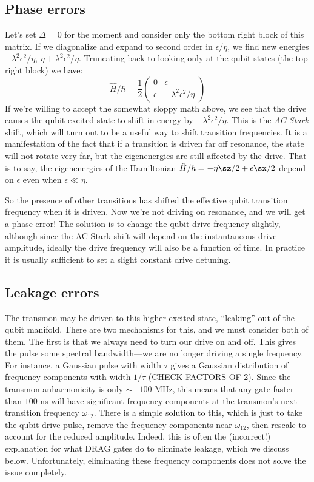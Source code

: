 \subsection{Phase errors}
\label{sec:qutritPhaseError}
Let's set $\Delta = 0$ for the moment and consider only the bottom right block of this matrix. If we diagonalize and expand to second order in $\epsilon/\eta$, we find new energies $-\lambda^2\epsilon^2/\eta$, $\eta + \lambda^2\epsilon^2/\eta$. Truncating back to looking only at the qubit states (the top right block) we have:
\begin{equation*}
    \hat{H}/\hbar = \frac{1}{2}\begin{pmatrix}
        0 & \epsilon \\ 
        \epsilon & -\lambda^2\epsilon^2/\eta
    \end{pmatrix}
\end{equation*}
If we're willing to accept the somewhat sloppy math above, we see that the drive causes the qubit excited state to shift in energy by $-\lambda^2\epsilon^2/\eta$. This is the \textit{AC Stark} shift, which will turn out to be a useful way to shift transition frequencies. It is a manifestation of the fact that if a transition is driven far off resonance, the state will not rotate very far, but the eigenenergies are still affected by the drive. That is to say, the eigenenergies of the Hamiltonian $\hat{H}/\hbar=-\eta\sz/2 +\epsilon\sx/2$ depend on $\epsilon$ even when $\epsilon \ll \eta$. 

So the presence of other transitions has shifted the effective qubit transition frequency when it is driven. Now we're not driving on resonance, and we will get a phase error! The solution is to change the qubit drive frequency slightly, although since the AC Stark shift will depend on the instantaneous drive amplitude, ideally the drive frequency will also be a function of time. In practice it is usually sufficient to set a slight constant drive detuning.


\subsection{Leakage errors}
The transmon may be driven to this higher excited state, ``leaking'' out of the qubit manifold. There are two mechanisms for this, and we must consider both of them. The first is that we always need to turn our drive on and off. This gives the pulse some spectral bandwidth---we are no longer driving a single frequency. For instance, a Gaussian pulse with width $\tau$ gives a Gaussian distribution of frequency components with width $1/\tau$ (CHECK FACTORS OF 2). Since the transmon anharmonicity is only $\sim -100$ MHz, this means that any gate faster than $100$ ns will have significant frequency components at the transmon's next transition frequency $\omega_{12}$. There is a simple solution to this, which is just to take the qubit drive pulse, remove the frequency components near $\omega_{12}$, then rescale to account for the reduced amplitude. Indeed, this is often the (incorrect!) explanation for what DRAG gates do to eliminate leakage, which we discuss below. Unfortunately, eliminating these frequency components does not solve the issue completely.

